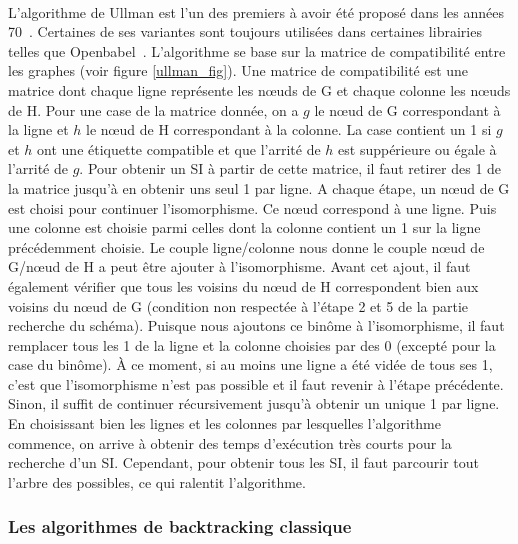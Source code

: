 \documentclass[12pt,french,twoside]{report}
\begin{document}
\paragraph{}L'algorithme de Ullman est l'un des premiers à avoir été proposé dans les années 70~\cite{ullmann_algorithm_1976}.
Certaines de ses variantes sont toujours utilisées dans certaines librairies telles que Openbabel~\cite{oboyle_open_2011}.
L'algorithme se base sur la matrice de compatibilité entre les graphes (voir figure \ref{ullman_fig}).
Une matrice de compatibilité est une matrice dont chaque ligne représente les n\oe{}uds de G et chaque colonne les n\oe{}uds de H.
Pour une case de la matrice donnée, on a $g$ le n\oe{}ud de G correspondant à la ligne et $h$ le n\oe{}ud de H correspondant à la colonne.
La case contient un 1 si $g$ et $h$ ont une étiquette compatible et que l'arrité de $h$ est suppérieure ou égale à l'arrité de $g$.
Pour obtenir un SI à partir de cette matrice, il faut retirer des 1 de la matrice jusqu'à en obtenir uns seul 1 par ligne.
A chaque étape, un n\oe{}ud de G est choisi pour continuer l'isomorphisme.
Ce n\oe{}ud correspond à une ligne.
Puis une colonne est choisie parmi celles dont la colonne contient un 1 sur la ligne précédemment choisie.
Le couple ligne/colonne nous donne le couple n\oe{}ud de G/n\oe{}ud de H a peut être ajouter à l'isomorphisme.
Avant cet ajout, il faut également vérifier que tous les voisins du n\oe{}ud de H correspondent bien aux voisins du n\oe{}ud de G (condition non respectée à l'étape 2 et 5 de la partie recherche du schéma).
Puisque nous ajoutons ce binôme à l'isomorphisme, il faut remplacer tous les 1 de la ligne et la colonne choisies par des 0 (excepté pour la case du binôme).
À ce moment, si au moins une ligne a été vidée de tous ses 1, c'est que l'isomorphisme n'est pas possible et il faut revenir à l'étape précédente.
Sinon, il suffit de continuer récursivement jusqu'à obtenir un unique 1 par ligne.
En choisissant bien les lignes et les colonnes par lesquelles l'algorithme commence, on arrive à obtenir des temps d'exécution très courts pour la recherche d'un SI.
Cependant, pour obtenir tous les SI, il faut parcourir tout l'arbre des possibles, ce qui ralentit l'algorithme.


\subsubsection{Les algorithmes de backtracking classique}
\end{document}
